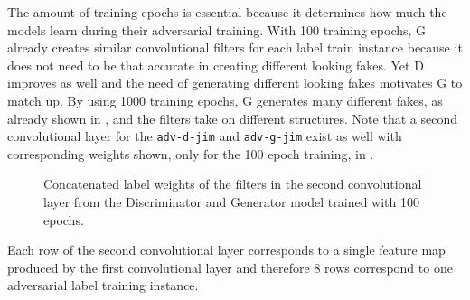 \FloatBarrier
\noindent
The amount of training epochs is essential because it determines how much the models learn during their adversarial training.
With 100 training epochs, G already creates similar convolutional filters for each label train instance because it does not need to be that accurate in creating different looking fakes.
Yet D improves as well and the need of generating different looking fakes motivates G to match up.
By using 1000 training epochs, G generates many different fakes, as already shown in , and the filters take on different structures.
Note that a second convolutional layer for the \texttt{adv-d-jim} and \texttt{adv-g-jim} exist as well with corresponding weights shown, only for the 100 epoch training, in .
\begin{figure}[!ht]
  \centering
  \qquad \qquad
  \caption{Concatenated label weights of the filters in the second convolutional layer from the Discriminator and Generator model trained with 100 epochs.}
  \label{fig:nn_adv_label_weights_conv1}
\end{figure}
\FloatBarrier
\noindent
Each row of the second convolutional layer corresponds to a single feature map produced by the first convolutional layer and therefore 8 rows correspond to one adversarial label training instance.